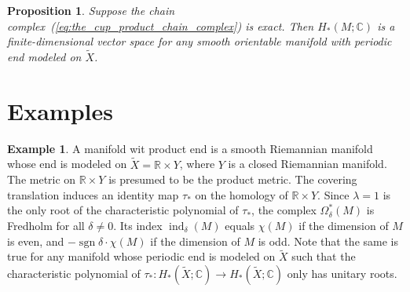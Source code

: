 \documentclass[a4paper, 12pt]{article}
\newtheorem{proposition}[theorem]{Proposition}
\theoremstyle{definition}
\newtheorem{example}[theorem]{Example}
\begin{document}
\begin{proposition}
    Suppose the chain complex~(\ref{eq:the_cup_product_chain_complex}) is exact. Then \({ H_{*}(M; \mathbb C) }\) is a finite-dimensional vector space for any smooth orientable manifold with periodic end modeled on \({ \tilde X }\).
\end{proposition}

\section{Examples}

\begin{example}
A manifold wit product end is a smooth Riemannian manifold whose end is modeled on \({ \tilde X = \mathbb R \times Y }\), where \({ Y }\) is a closed Riemannian manifold. The metric on \({ \mathbb R \times Y }\) is presumed to be the product metric. The covering translation induces an identity map \({ \tau_{*} }\) on the homology of \({ \mathbb R \times Y }\). Since \({ \lambda = 1 }\) is the only root of the characteristic polynomial of \({ \tau_{*} }\), the complex \({ \Omega_{\delta}^{*}(M) }\) is Fredholm for all \({ \delta \neq 0 }\). Its index \({ \operatorname{ind}_{\delta}(M) }\) equals \({ \chi(M) }\) if the dimension of \({ M }\) is even, and \({ -\operatorname{sgn}\delta \cdot \chi(M) }\) if the dimension of \({ M }\) is odd. Note that the same is true for any manifold whose periodic end is modeled on \({ \tilde X }\) such that the characteristic polynomial of \({ \tau_{*} : H_{*}(\tilde X; \mathbb C) \to H_{*}(\tilde X; \mathbb C) }\) only has unitary roots.
\end{example}
\end{document}

